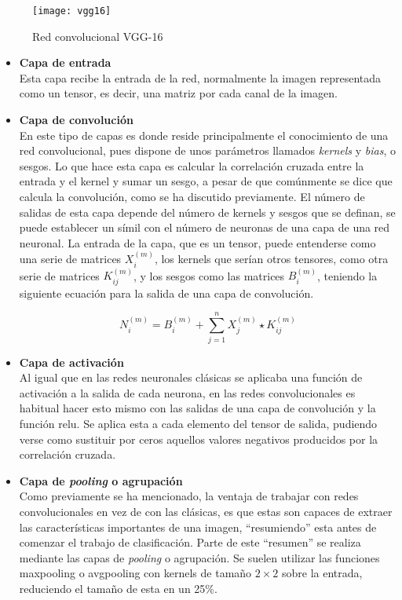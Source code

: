 			\begin{figure}[!h]
				\centering
				\texttt{[image: vgg16]}
				\caption{Red convolucional VGG-16}
				\label{fig:vgg16}
			\end{figure}
			
			\begin{itemize}
				\item \textbf{Capa de entrada}\\
				Esta capa recibe la entrada de la red, normalmente la imagen representada como un tensor, es decir, una matriz por cada canal de la imagen. 
				
				\item \textbf{Capa de convolución}\\
				En este tipo de capas es donde reside principalmente el conocimiento de una red convolucional, pues dispone de unos parámetros llamados \textit{kernels} y \textit{bias}, o sesgos. Lo que hace esta capa es calcular la correlación cruzada entre la entrada y el kernel y sumar un sesgo, a pesar de que comúnmente se dice que calcula la convolución, como se ha discutido previamente. El número de salidas de esta capa depende del número de kernels y sesgos que se definan, se puede establecer un símil con el número de neuronas de una capa de una red neuronal. La entrada de la capa, que es un tensor, puede entenderse como una serie de matrices $X_i^{(m)}$, los kernels que serían otros tensores, como otra serie de matrices $K_{ij}^{(m)}$, y los sesgos como las matrices $B_i^{(m)}$, teniendo la siguiente ecuación para la salida de una capa de convolución. 
				
				$$
				N_i^{(m)} = B_i^{(m)} + \sum_{j = 1}^n X_j^{(m)} \star K_{ij}^{(m)}
				$$
				
				\item \textbf{Capa de activación}\\
				Al igual que en las redes neuronales clásicas se aplicaba una función de activación a la salida de cada neurona, en las redes convolucionales es habitual hacer esto mismo con las salidas de una capa de convolución y la función \gls{relu}. Se aplica esta a cada elemento del tensor de salida, pudiendo verse como sustituir por ceros aquellos valores negativos producidos por la correlación cruzada. 
				
				\item \textbf{Capa de \textit{pooling} o agrupación}\\
				Como previamente se ha mencionado, la ventaja de trabajar con redes convolucionales en vez de con las clásicas, es que estas son capaces de extraer las características importantes de una imagen, ``resumiendo'' esta antes de comenzar el trabajo de clasificación. Parte de este ``resumen'' se realiza mediante las capas de \textit{pooling} o agrupación. Se suelen utilizar las funciones maxpooling o avgpooling con kernels de tamaño $2\times2$ sobre la entrada, reduciendo el tamaño de esta en un 25\%. 
				

\end{itemize}
